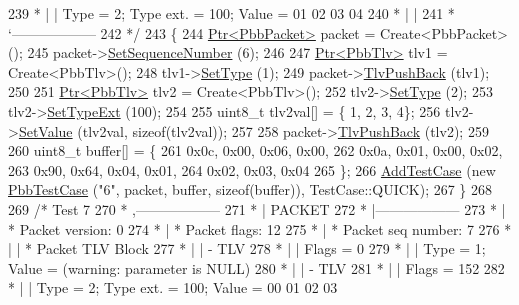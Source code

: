 \begin{DoxyCode}
239 \textcolor{comment}{         * |    |         Type = 2; Type ext. = 100; Value = 01  02  03  04}
240 \textcolor{comment}{         * |    |}
241 \textcolor{comment}{         * `------------------}
242 \textcolor{comment}{   */}
243   \{
244     \hyperlink{classns3_1_1Ptr}{Ptr<PbbPacket>} packet = Create<PbbPacket> ();
245     packet->\hyperlink{classns3_1_1PbbPacket_a7d6a1602be86109760d0f26ff9bbbb8e}{SetSequenceNumber} (6);
246 
247     \hyperlink{classns3_1_1Ptr}{Ptr<PbbTlv>} tlv1 = Create<PbbTlv>();
248     tlv1->\hyperlink{classns3_1_1PbbTlv_a90a0452018ed364ac37c3ad116dd718b}{SetType} (1);
249     packet->\hyperlink{classns3_1_1PbbPacket_a34935793e729a106c176db99c969cb42}{TlvPushBack} (tlv1);
250 
251     \hyperlink{classns3_1_1Ptr}{Ptr<PbbTlv>} tlv2 = Create<PbbTlv>();
252     tlv2->\hyperlink{classns3_1_1PbbTlv_a90a0452018ed364ac37c3ad116dd718b}{SetType} (2);
253     tlv2->\hyperlink{classns3_1_1PbbTlv_aebc3df25cac008223fda7d3954c17638}{SetTypeExt} (100);
254 
255     uint8\_t tlv2val[] = \{ 1, 2, 3, 4\};
256     tlv2->\hyperlink{classns3_1_1PbbTlv_a1ca7d32f9b68990225f3267c2cc09f11}{SetValue} (tlv2val, \textcolor{keyword}{sizeof}(tlv2val));
257 
258     packet->\hyperlink{classns3_1_1PbbPacket_a34935793e729a106c176db99c969cb42}{TlvPushBack} (tlv2);
259 
260     uint8\_t buffer[] = \{
261       0x0c, 0x00, 0x06, 0x00,
262       0x0a, 0x01, 0x00, 0x02,
263       0x90, 0x64, 0x04, 0x01,
264       0x02, 0x03, 0x04
265     \};
266     \hyperlink{classns3_1_1TestCase_a3718088e3eefd5d6454569d2e0ddd835}{AddTestCase} (\textcolor{keyword}{new} \hyperlink{classPbbTestCase}{PbbTestCase} (\textcolor{stringliteral}{"6"}, packet, buffer, \textcolor{keyword}{sizeof}(buffer)), 
      TestCase::QUICK);
267   \}
268 
269   \textcolor{comment}{/* Test 7}
270 \textcolor{comment}{         * ,------------------}
271 \textcolor{comment}{         * |  PACKET}
272 \textcolor{comment}{         * |------------------}
273 \textcolor{comment}{         * | * Packet version:    0}
274 \textcolor{comment}{         * | * Packet flags:  12}
275 \textcolor{comment}{         * | * Packet seq number: 7}
276 \textcolor{comment}{         * |    | * Packet TLV Block}
277 \textcolor{comment}{         * |    |     - TLV}
278 \textcolor{comment}{         * |    |         Flags = 0}
279 \textcolor{comment}{         * |    |         Type = 1; Value = (warning: parameter is NULL)}
280 \textcolor{comment}{         * |    |     - TLV}
281 \textcolor{comment}{         * |    |         Flags = 152}
282 \textcolor{comment}{         * |    |         Type = 2; Type ext. = 100; Value = 00  01  02  03}

\end{DoxyCode}
